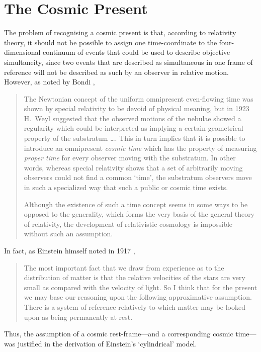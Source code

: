 \documentclass[11pt]{article}
\begin{document}
\section{The Cosmic Present \label{sec_TCP}}
The problem of recognising a cosmic present is that, according to relativity theory, it should not be possible to assign one time-coordinate to the four-dimensional continuum of events that could be used to describe objective simultaneity, since two events that are described as simultaneous in one frame of reference will not be described as such by an observer in relative motion. However, as noted by Bondi \cite{Bondi1960},
\begin{quotation}
The Newtonian concept of the uniform omnipresent even-flowing time was shown by special relativity to be devoid of physical meaning, but in 1923 H.\ Weyl suggested that the observed motions of the nebulae showed a regularity which could be interpreted as implying a certain geometrical property of the substratum \ldots. This in turn implies that it is possible to introduce an omnipresent \textit{cosmic time} which has the property of measuring \textit{proper time} for every observer moving with the substratum. In other words, whereas special relativity shows that a set of arbitrarily moving observers could not find a common `time', the substratum observers move in such a specialized way that such a public or cosmic time exists.

Although the existence of such a time concept seems in some ways to be opposed to the generality, which forms the very basis of the general theory of relativity, the development of relativistic cosmology is impossible without such an assumption.
\end{quotation}
In fact, as Einstein himself noted in 1917 \cite{Einstein1917}, 
\begin{quotation}
The most important fact that we draw from experience as to the distribution of matter is that the relative velocities of the stars are very small as compared with the velocity of light. So I think that for the present we may base our reasoning upon the following approximative assumption. There is a system of reference relatively to which matter may be looked upon as being permanently at rest.
\end{quotation}
Thus, the assumption of a cosmic rest-frame---and a corresponding cosmic time---was justified in the derivation of Einstein's `cylindrical' model.
\end{document}
